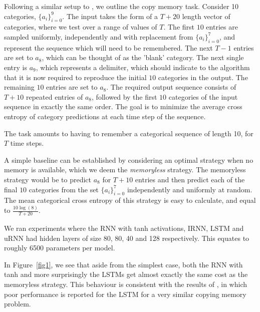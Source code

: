 \documentclass{article} %
\begin{document}
Following a similar setup to \cite{LSTM}, we outline the copy memory task.
Consider 10 categories, $\{ a_i \}_{i=0}^9$.   
The input takes the form of a $T+20$ length vector of categories, where we test over a range of values
of $T$. 
The first $10$ entries are sampled uniformly, independently and with replacement from $\{a_i\}_{i=0}^7$,
and represent the sequence which will need to be remembered. 
The next $T-1$ entries are set to $a_8$, which can be thought of as the 'blank' category. 
The next single entry is $a_9$, which represents a delimiter, which should indicate to the algorithm
that it is now required to reproduce the initial $10$ categories in the output. 
The remaining $10$ entries are set to $a_8$. The required output sequence consists of $T+10$ 
repeated entries of $a_8$, followed by the first $10$ categories of the input sequence in exactly the
same order. The goal is to minimize the average cross entropy of category predictions 
at each time step of the sequence.
 
The task amounts to having to remember a categorical sequence of length 10, for $T$ time steps.

A simple baseline can be established by considering an optimal strategy when no memory is available, 
which we deem the \textit{memoryless} strategy. The memoryless strategy would be to predict $a_8$ for 
$T+10$ entries and then predict each of the final $10$ categories from the set $\{a_i\}_{i=0}^7$ independently
and uniformly at random. The mean categorical cross entropy of this strategy is easy to calculate, and equal 
to $\frac{10 \log(8) }{T+20}$. 

We ran experiments where the RNN with tanh activations, IRNN, LSTM and uRNN had hidden layers of size 
80, 80, 40 and 128 respectively. This equates to roughly 6500 parameters per model. 

In Figure~\ref{fig1}, we see that aside from the simplest case, both the RNN with tanh and more surprisingly 
the LSTMs get almost exactly the same cost as the memoryless strategy. This behaviour is consistent 
with the results of \cite{NTM}, in which poor performance is reported for the LSTM for a very similar 
copying memory problem.
\end{document}

